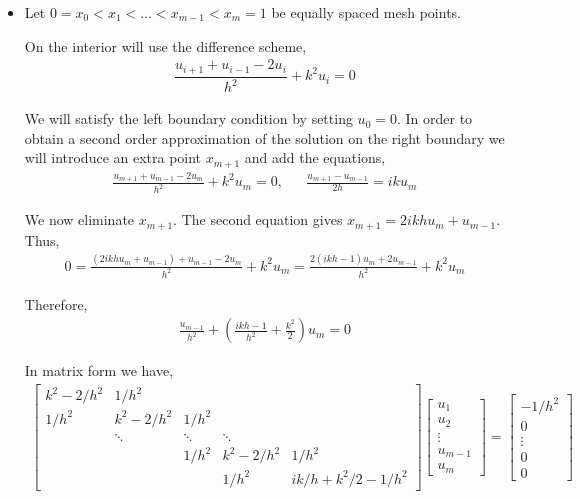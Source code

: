\documentclass[10pt]{article}
\begin{document}
\begin{solution}[Solution]
\begin{itemize}
\item
Let \( 0 = x_0<x_1< \ldots < x_{m-1} < x_{m} = 1 \) be equally spaced mesh points.

On the interior will use the difference scheme,
\begin{align*}
    \dfrac{u_{i+1}+u_{i-1}-2u_i}{h^2} + k^2 u_i = 0
\end{align*}

We will satisfy the left boundary condition by setting \( u_0 = 0 \). In order to obtain a second order approximation of the solution on the right boundary we will introduce an extra point \( x_{m+1} \) and add the equations,
\begin{align*}
    \frac{u_{m+1}+u_{m-1} - 2u_{m}}{h^2}  + k^2 u_m = 0
    , && \frac{u_{m+1}-u_{m-1}}{2h} = ik u_{m}
\end{align*}

We now eliminate \( x_{m+1} \). The second equation gives \( x_{m+1} = 2ikhu_{m} + u_{m-1} \). Thus,
\begin{align*}
    0 = \frac{(2ikhu_{m} + u_{m-1}) + u_{m-1} - 2u_{m}}{h^2} + k^2u_m
    = \frac{2(ikh-1)u_{m} + 2u_{m-1}}{h^2}+k^2u_m
\end{align*}

Therefore,
\begin{align*}
    \frac{u_{m-1}}{h^2} + \left(\frac{ikh-1}{h^2} + \frac{k^2}{2} \right)u_{m} = 0
\end{align*}


In matrix form we have,
\begin{align*}
    \left[\begin{array}{ccccccc}
    k^2-2/h^2 & 1/h^2 \\
    1/h^2  & k^2 - 2/h^2 & 1/h^2  \\
    & \ddots & \ddots & \ddots \\
    & & 1/h^2  & k^2-2/h^2 & 1/h^2  \\
    & & & 1/h^2 & ik/h+k^2/2 -1/h^2
    \end{array}\right]
    \left[\begin{array}{c}
    u_1 \\ u_2 \\ \vdots \\ u_{m-1} \\ u_{m}
    \end{array}\right]
    =
    \left[\begin{array}{c}
    -1/h^2 \\ 0 \\  \vdots \\ 0 \\ 0\end{array}\right]
\end{align*}



\end{itemize}
\end{solution}
\end{document}
